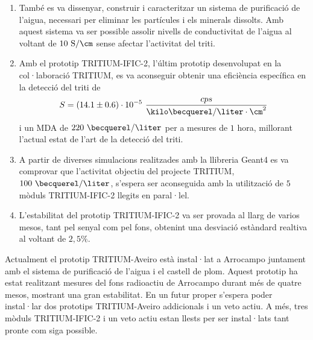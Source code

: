 \begin{enumerate}
\item{} També es va dissenyar, construir i caracteritzar un sistema de purificació de l'aigua, necessari per eliminar les partícules i els minerals dissolts. Amb aquest sistema va ser possible assolir nivells de conductivitat de l'aigua al voltant de $10~\text{S}/\cm$ sense afectar l'activitat del triti.

\item{} Amb el prototip TRITIUM-IFIC-2, l'últim prototip desenvolupat en la col·laboració TRITIUM, es va aconseguir obtenir una eficiència específica en la detecció del triti de
$$S = (14.1 \pm 0.6)\cdot{} 10^{-5}~\frac{cps}{\kilo\becquerel/\liter \cdot{} \cm^{2}}$$
i un MDA de $220~\becquerel/\liter$ per a mesures de $1$ hora, millorant l'actual estat de l'art de la detecció del triti.

\item{} A partir de diverses simulacions realitzades amb la llibreria Geant4 es va comprovar que l'activitat objectiu del projecte TRITIUM, $100~\becquerel/\liter$, s'espera ser aconseguida amb la utilització de $5$ mòduls TRITIUM-IFIC-2 llegits en paral·lel.

\item{} L'estabilitat del prototip TRITIUM-IFIC-2 va ser provada al llarg de varios mesos, tant pel senyal com pel fons, obtenint una desviació estàndard realtiva al voltant de $2,5\%$.

\end{enumerate}

Actualment el prototip TRITIUM-Aveiro està instal·lat a Arrocampo juntament amb el sistema de purificació de l'aigua i el castell de plom. Aquest prototip ha estat realitzant mesures del fons radioactiu de Arrocampo durant més de quatre mesos, mostrant una gran estabilitat. En un futur proper s'espera poder instal·lar dos prototips TRITIUM-Aveiro addicionals i un veto actiu. A més, tres mòduls TRITIUM-IFIC-2 i un veto actiu estan llests per ser instal·lats tant pronte com siga possible.